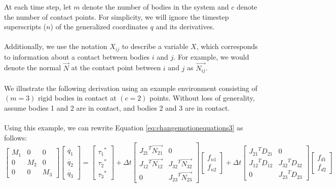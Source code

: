 At each time step, let $m$ denote the number of bodies in the system and $c$ denote the number of contact points.
For simplicity, we will ignore the timestep superscripts ($n$) of the generalized coordinates $q$ and its derivatives.
\\
\\
Additionally, we use the notation $X_{ij}$ to describe a variable $X$, which corresponds to information about a contact between bodies $i$ and $j$.
For example, we would denote the normal $\vec{N}$ at the contact point between $i$ and $j$ as $\vec{N_{ij}}$.
\\
\\
We illustrate the following derivation using an example environment consisting of $(m = 3)$ rigid bodies in contact at $(c = 2)$ points. Without loss of generality, assume bodies 1 and 2 are in contact, and bodies 2 and 3 are in contact.
\\
\\
Using this example, we can rewrite Equation \ref{eq:changemotionequations3} as follows:
\begin{equation}
\label{eq:changemotionequations4}
\left[\begin{matrix}M_1  & 0 & 0 \\ 0 & M_2 & 0 \\ 0 & 0 & M_3\end{matrix}\right]\left[\begin{matrix}\dot{q_1} \\ \dot{q_2} \\ \dot{q_3}\end{matrix}\right] = \left[\begin{matrix}{\tau_1}^* \\ {\tau_2}^* \\ {\tau_3}^*\end{matrix}\right] + \Delta{t}\left[\begin{matrix}{J_{21}}^T\vec{N_{21}} & 0 \\ {J_{12}}^T\vec{N_{12}} & {J_{32}}^T\vec{N_{32}} \\ 0 & {J_{23}}^T\vec{N_{23}} \end{matrix}\right]\left[\begin{matrix}f_{n1} \\ f_{n2}\end{matrix}\right] + \Delta{t}\left[\begin{matrix}{J_{21}}^TD_{21} & 0 \\ {J_{12}}^TD_{12} & {J_{32}}^TD_{32} \\ 0 & {J_{23}}^TD_{23} \end{matrix}\right]\left[\begin{matrix}f_{d1} \\ f_{d2}\end{matrix}\right]
\end{equation}
